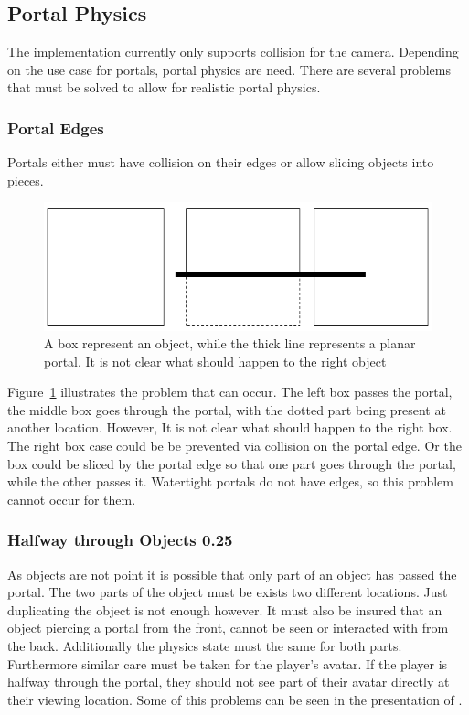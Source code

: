 \subsection{Portal Physics}
\label{section:portalphysics}
The implementation currently only supports collision for the camera. Depending on the use case for portals, portal physics are need. There are several problems that must be solved to allow for realistic portal physics.

\subsubsection{Portal Edges}
Portals either must have collision on their edges or allow slicing objects into pieces.

\begin{figure}[h]
	\centering
	\includegraphics[width=\linewidth]{images/edgecollision.png}
	\caption{A box represent an object, while the thick line represents a planar portal. It is not clear what should happen to the right object}
	\label{fig:edgecollision}
\end{figure}

Figure~\ref{fig:edgecollision} illustrates the problem that can occur. The left box passes the portal, the middle box goes through the portal, with the dotted  part being present at another location. However, It is not clear what should happen to the right box. The right box case could be  be prevented via collision on the portal edge.  Or the box could be sliced by the portal edge so that one part goes through the portal, while the other passes it. Watertight portals do not have edges, so this problem cannot occur for them.

\subsubsection{Halfway through Objects 0.25}
As objects are not point it is possible that only part of an object has passed the portal. The two parts of the object must be exists two different locations. Just duplicating the object is not enough however. It must also be insured that an object piercing a portal from the front, cannot be seen or interacted with from the back. Additionally the physics state must the same for both parts. Furthermore similar care must be taken for the player's avatar. If the player is halfway through the portal, they should not see part of their avatar directly at their viewing location. Some of this problems can be seen in the presentation of \textcite{lecture:portalProblems}.


